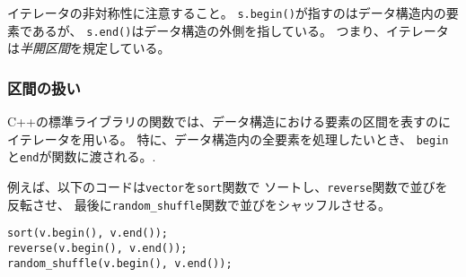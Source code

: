 イテレータの非対称性に注意すること。
\texttt{s.begin()}が指すのはデータ構造内の要素であるが、
\texttt{s.end()}はデータ構造の外側を指している。
つまり、イテレータは\emph{半開区間}を規定している。


\begin{comment}
\subsubsection{Working with ranges}

Iterators are used in C++ standard library functions
that are given a range of elements in a data structure.
Usually, we want to process all elements in a
data structure, so the iterators
\texttt{begin} and \texttt{end} are given for the function.
\end{comment}

\subsubsection{区間の扱い}

C++の標準ライブラリの関数では、データ構造における要素の区間を表すのに
イテレータを用いる。
特に、データ構造内の全要素を処理したいとき、
\texttt{begin}と\texttt{end}が関数に渡される。.

\begin{comment}
For example, the following code sorts a vector
using the function \texttt{sort},
then reverses the order of the elements using the function
\texttt{reverse}, and finally shuffles the order of
the elements using the function \texttt{random\_shuffle}.
\end{comment}

例えば、以下のコードは\texttt{vector}を\texttt{sort}関数で
ソートし、\texttt{reverse}関数で並びを反転させ、
最後に\texttt{random\_shuffle}関数で並びをシャッフルさせる。


\begin{lstlisting}
sort(v.begin(), v.end());
reverse(v.begin(), v.end());
random_shuffle(v.begin(), v.end());
\end{lstlisting}

\begin{comment}
These functions can also be used with an ordinary array.
In this case, the functions are given pointers to the array
instead of iterators:
\end{comment}

